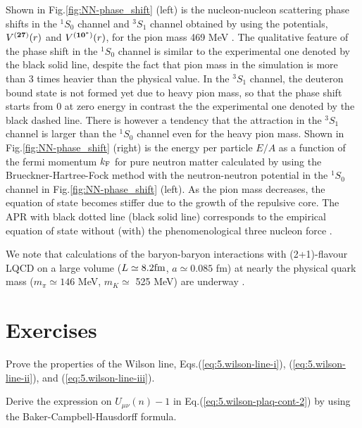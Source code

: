  Shown in  Fig.\ref{fig:NN-phase_shift} (left) is  the nucleon-nucleon scattering phase shifts
  in the $^1S_0$ channel and $^3S_1$ channel obtained by using the 
   potentials, $V^{({\bf 27})}(r)$ and $V^{({\bf 10}^*)}(r)$,  for the pion mass 469 MeV \cite{Inoue:2013nfe}.
   The qualitative feature of the 
   phase shift in the $^1S_0$ channel is similar to the experimental one denoted by the 
   black solid  line, despite the fact that pion mass in the simulation is  more than 3 times
   heavier than the physical value. In the  $^3S_1$ channel, the deuteron bound state is 
   not formed yet due to heavy pion mass, so that the phase shift starts from 0 at zero energy
    in contrast the the experimental one denoted by the black dashed line.
    There is however a tendency that the attraction in the $^3S_1$ channel is larger than
   the $^1S_0$ channel even for the heavy pion mass.
  Shown in  Fig.\ref{fig:NN-phase_shift} (right) is  the energy per particle $E/A$ as a function of the 
  fermi momentum $k_{\rm F}$ for pure neutron matter calculated by using the Brueckner-Hartree-Fock method
  with the neutron-neutron potential in the $^1S_0$ channel in Fig.\ref{fig:NN-phase_shift} (left). 
 As the pion mass decreases, the equation of state becomes stiffer due to the growth of the repulsive  core. 
 The APR with black dotted line (black solid line)   corresponds to the empirical equation of state without (with) the
phenomenological three nucleon force  \cite{Akmal:1998cf}.

 We note that calculations of the baryon-baryon interactions  with  
  (2+1)-flavour LQCD on a large volume ($L \simeq 8.2 {\rm fm}$, $a\simeq 0.085$ fm) at
   nearly the physical quark mass ($m_{\pi}\simeq146$ MeV, $m_{K}\simeq$ 525 MeV)
   are underway  \cite{Doi:2015oha}.
 
  
\section{Exercises}

\begin{prob} \label{prob:1}
Prove the properties of the Wilson line, Eqs.(\ref{eq:5.wilson-line-i}), (\ref{eq:5.wilson-line-ii}), and (\ref{eq:5.wilson-line-iii}).
\end{prob}

\begin{prob}\label{prob:2}
Derive the expression on $U_{\mu \nu}(n)-1$ in 
Eq.(\ref{eq:5.wilson-plaq-cont-2}) by using the Baker-Campbell-Hausdorff formula.
\end{prob}

